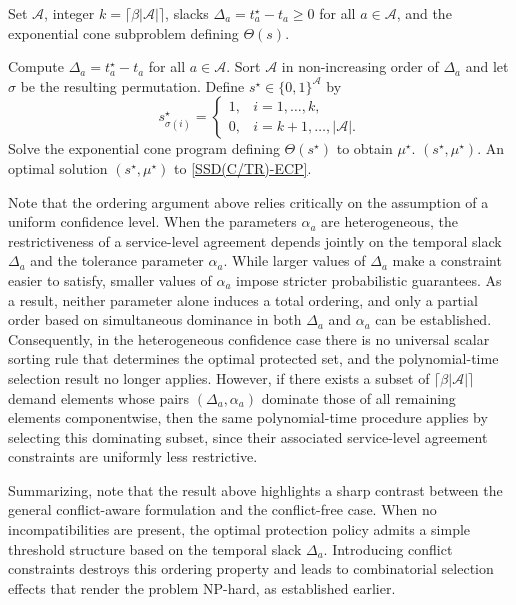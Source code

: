 \documentclass[letter,11pt, reqno]{amsart}
\def\A{\mathcal{A}}
\begin{document}
\begin{algorithm}[t]
\caption{Polynomial time solution for the conflict-free case and uniform confidence levels.}
\label{alg:poly_no_conflicts}
\begin{algorithmic}[1]
\Input Set $\mathcal A$, integer $k=\lceil \beta|\A|\rceil$, slacks
$\Delta_a=t_a^\star-t_a\ge 0$ for all $a\in\mathcal A$, and the exponential cone
subproblem defining $\Theta(s)$.

\State Compute $\Delta_a=t_a^\star-t_a$ for all $a\in\mathcal A$.
\State Sort $\mathcal A$ in non-increasing order of $\Delta_a$ and let $\sigma$ be
the resulting permutation.
\State Define $s^\star\in\{0,1\}^{\mathcal A}$ by
$$
s^\star_{\sigma(i)}=
\begin{cases}
1, & i=1,\ldots,k,\\
0, & i=k+1,\ldots,|\mathcal A|.
\end{cases}
$$
\State Solve the exponential cone program defining $\Theta(s^\star)$
to obtain $\mu^\star$.
\State \Return $(s^\star,\mu^\star)$.
\Output An optimal solution $(s^\star,\mu^\star)$ to
\ref{SSD(C/TR)-ECP}.
\end{algorithmic}
\end{algorithm}

Note that the ordering argument above relies critically on the assumption of a uniform
confidence level.
When the parameters $\alpha_a$ are heterogeneous, the restrictiveness of a
service-level agreement depends jointly on the temporal slack $\Delta_a$ and the
tolerance parameter $\alpha_a$.
While larger values of $\Delta_a$ make a constraint easier to satisfy, smaller
values of $\alpha_a$ impose stricter probabilistic guarantees.
As a result, neither parameter alone induces a total ordering, and only a
partial order based on simultaneous dominance in both $\Delta_a$ and $\alpha_a$
can be established.
Consequently, in the heterogeneous confidence case there is no universal scalar
sorting rule that determines the optimal protected set, and the polynomial-time
selection result no longer applies. However, if there exists a subset of $\lceil \beta|\A|\rceil$ demand elements whose pairs
$(\Delta_a,\alpha_a)$ dominate those of all remaining elements componentwise,
then the same polynomial-time procedure applies by selecting this dominating
subset, since their associated service-level agreement constraints are uniformly
less restrictive.

Summarizing, note that the result above highlights a sharp contrast between the general conflict-aware
formulation and the conflict-free case.
When no incompatibilities are present, the optimal protection policy admits a
simple threshold structure based on the temporal slack $\Delta_a$.
Introducing conflict constraints destroys this ordering property and leads to
combinatorial selection effects that render the problem NP-hard, as established
earlier.
\end{document}
